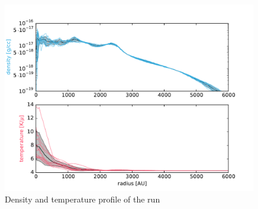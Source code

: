 \begin{figure}[!htb]
 \centering
 \includegraphics[width=0.99\textwidth]{Figures/var_rt_profiles/timeave_n10c1_6000AU}
 \captionsetup{justification=justified,singlelinecheck=false,width=\linewidth}
 \decoRule
 \caption[ profiles]{Density and temperature profile of the  run}
\label{fig:n10c1.0_profile}
\end{figure}
\FloatBarrier

